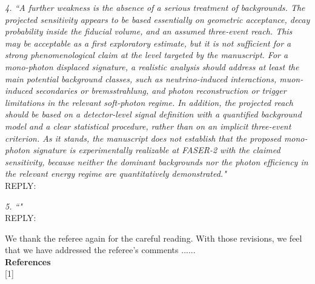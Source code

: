 \documentclass[12pt]{article}
\begin{document}
{\it 4. ``A further weakness is the absence of a serious treatment of backgrounds. The projected sensitivity appears to be based essentially on geometric acceptance, decay probability inside the fiducial volume, and an assumed three-event reach. This may be acceptable as a first exploratory estimate, but it is not sufficient for a strong phenomenological claim at the level targeted by the manuscript. For a mono-photon displaced signature, a realistic analysis should address at least the main potential background classes, such as neutrino-induced interactions, muon-induced secondaries or bremsstrahlung, and photon reconstruction or trigger limitations in the relevant soft-photon regime. In addition, the projected reach should be based on a detector-level signal definition with a quantified background model and a clear statistical procedure, rather than on an implicit three-event criterion. As it stands, the manuscript does not establish that the proposed mono-photon signature is experimentally realizable at FASER-2 with the claimed sensitivity, because neither the dominant backgrounds nor the photon efficiency in the relevant energy regime are quantitatively demonstrated." } \\

REPLY:  

\smallskip
\noindent


{\it 5. ``" } \\

REPLY:  

\smallskip
\noindent
 We thank the referee again for the careful reading. With those revisions, we feel that we have addressed  the referee's comments ...... \\


{\bf References }  \\


[1] 
\end{document}

